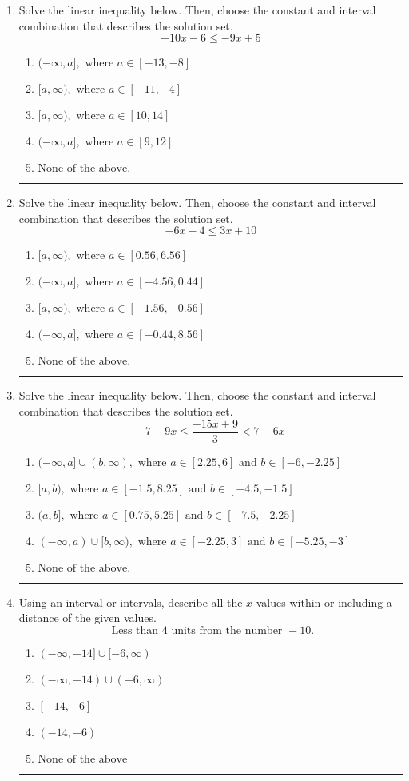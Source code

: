 \documentclass[14pt]{extbook}
\newcommand{\litem}[1]{\item#1\hspace*{-1cm}\rule{\textwidth}{0.4pt}}
\begin{document}
\begin{enumerate}
{\begin{enumerate}[label=\Alph*.]
\end{enumerate} }
\litem{
Solve the linear inequality below. Then, choose the constant and interval combination that describes the solution set.\[ -10x -6 \leq -9x + 5 \]\begin{enumerate}[label=\Alph*.]
\item \( (-\infty, a], \text{ where } a \in [-13, -8] \)
\item \( [a, \infty), \text{ where } a \in [-11, -4] \)
\item \( [a, \infty), \text{ where } a \in [10, 14] \)
\item \( (-\infty, a], \text{ where } a \in [9, 12] \)
\item \( \text{None of the above}. \)

\end{enumerate} }
\litem{
Solve the linear inequality below. Then, choose the constant and interval combination that describes the solution set.\[ -6x -4 \leq 3x + 10 \]\begin{enumerate}[label=\Alph*.]
\item \( [a, \infty), \text{ where } a \in [0.56, 6.56] \)
\item \( (-\infty, a], \text{ where } a \in [-4.56, 0.44] \)
\item \( [a, \infty), \text{ where } a \in [-1.56, -0.56] \)
\item \( (-\infty, a], \text{ where } a \in [-0.44, 8.56] \)
\item \( \text{None of the above}. \)

\end{enumerate} }
\litem{
Solve the linear inequality below. Then, choose the constant and interval combination that describes the solution set.\[ -7 - 9 x \leq \frac{-15 x + 9}{3} < 7 - 6 x \]\begin{enumerate}[label=\Alph*.]
\item \( (-\infty, a] \cup (b, \infty), \text{ where } a \in [2.25, 6] \text{ and } b \in [-6, -2.25] \)
\item \( [a, b), \text{ where } a \in [-1.5, 8.25] \text{ and } b \in [-4.5, -1.5] \)
\item \( (a, b], \text{ where } a \in [0.75, 5.25] \text{ and } b \in [-7.5, -2.25] \)
\item \( (-\infty, a) \cup [b, \infty), \text{ where } a \in [-2.25, 3] \text{ and } b \in [-5.25, -3] \)
\item \( \text{None of the above.} \)

\end{enumerate} }
\litem{
Using an interval or intervals, describe all the $x$-values within or including a distance of the given values.\[ \text{ Less than } 4 \text{ units from the number } -10. \]\begin{enumerate}[label=\Alph*.]
\item \( (-\infty, -14] \cup [-6, \infty) \)
\item \( (-\infty, -14) \cup (-6, \infty) \)
\item \( [-14, -6] \)
\item \( (-14, -6) \)
\item \( \text{None of the above} \)


\end{enumerate}}
\end{enumerate}
\end{document}
